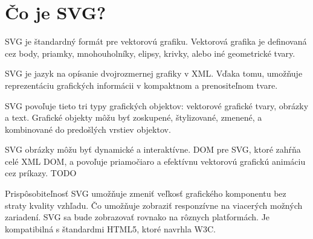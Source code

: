 

%
%
%





\section{Čo je SVG?}
\ac{SVG} je štandardný formát pre vektorovú grafiku. Vektorová grafika je definovaná cez body, priamky, mnohouholníky, elipsy, krivky, alebo iné geometrické tvary.  

\acs{SVG} je jazyk na opísanie dvojrozmernej grafiky v   \ac*{XML}. Vďaka tomu, umožňuje reprezentáciu grafických informácii v kompaktnom a prenositeľnom tvare.

 SVG povoľuje tieto tri typy grafických objektov: vektorové grafické tvary, obrázky a text. 
Grafické objekty môžu byť zoskupené, štylizované, zmenené, a kombinované do predošlých vrstiev objektov. 

SVG obrázky môžu byť dynamické a interaktívne. \ac*{DOM} pre SVG, ktoré zahŕňa celé XML DOM, a povoľuje priamočiaro a efektívnu vektorovú grafickú animáciu cez príkazy. TODO

Prispôsobiteľnosť SVG umožňuje zmeniť veľkosť grafického komponentu bez straty kvality vzhľadu. Čo umožňuje zobraziť responzívne na viacerých možných zariadení. 
SVG sa bude zobrazovať rovnako na rôznych platformách. Je kompatibilná s štandardmi \acs{HTML}5, ktoré navrhla \ac*{W3C}. 



 
